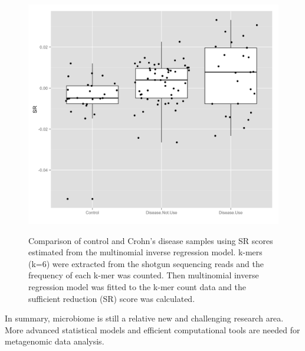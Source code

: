 \begin{figure}[p]
\centering
{\includegraphics[scale=0.25,trim=0 0 0 0,clip]{Figure/F52_SR_control_disease_antibiotics.png}
}
\caption[Comparison of control and Crohn's disease samples stratified by antibiotic  using SR scores estimated from the multinomial inverse regression model]{Comparison of control and Crohn's disease samples  using SR scores estimated from the multinomial inverse regression model.  k-mers (k=6) were extracted from the shotgun sequencing reads and the frequency of each k-mer was counted. Then multinomial inverse regression model was fitted to the k-mer count data and the sufficient reduction (SR) score was calculated. 
}
\label{F52_SR_control_disease_antibiotics}
\end{figure}

In summary, microbiome is still a relative new and challenging research area. More advanced statistical models and efficient computational tools are  needed for metagenomic data analysis. 